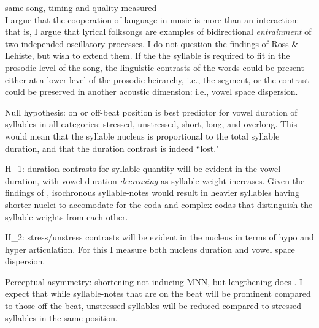 same song, timing and quality measured
\citep{rossFormants90}
\citep{rossStudyTimingEstonian1989a} \\

I argue that the cooperation of language in music is more than an interaction: that is, I argue that lyrical folksongs are examples of bidirectional {\it entrainment} of two independed oscillatory processes. I do not question the findings of Ross \& Lehiste, but wish to extend them. If the the syllable is required to fit in the prosodic level of the song, the linguistic contrasts of the words could be present either at a lower level of the prosodic heirarchy, i.e.,  the segment, or the contrast could be preserved in another acoustic dimension: i.e.,  vowel space dispersion. 


Null hypothesis: on or off-beat position is best predictor for vowel duration of syllables in all categories: stressed, unstressed, short, long, and overlong. This would mean that the syllable nucleus is proportional to the total syllable duration, and that the duration contrast is indeed ``lost." 

H_{1}: duration contrasts for syllable quantity will be evident in the vowel duration, with vowel duration {\it decreasing} as syllable weight increases. Given the findings of \citep{rosslehiste}, isochronous syllable-notes would result in heavier syllables having shorter nuclei to accomodate for the coda and complex codas that distinguish the syllable weights from each other. 

H_{2}: stress/unstress contrasts will be evident in the nucleus in terms of hypo and hyper articulation. For this I measure both nucleus duration and vowel space dispersion. 

Perceptual asymmetry: shortening not inducing MNN, but lengthening does \citep{eestiMNNasymmetry}. I expect that while syllable-notes that are on the beat will be prominent compared to those off the beat, unstressed syllables will be reduced compared to stressed syllables in the same position. 
